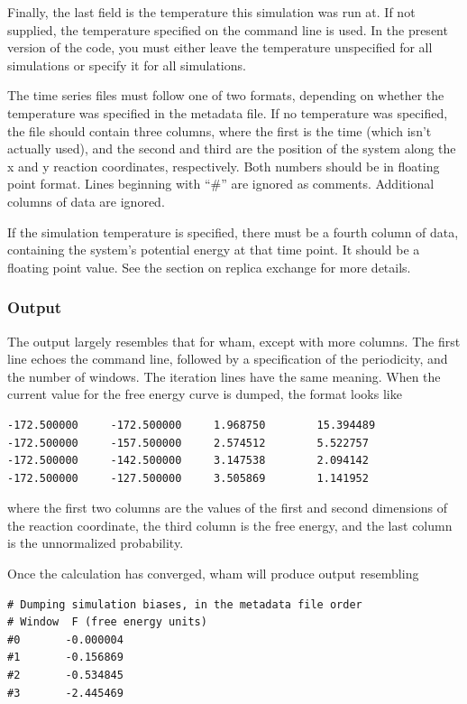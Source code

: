 \documentclass[12pt]{article}
\begin{document}
Finally, the last field is the temperature this simulation was run at.  If
not supplied, the temperature specified on the command line is used.  In
the present version of the code, you must either leave the temperature
unspecified for all simulations or specify it for all simulations.

The time series files must follow one of two formats, depending on whether
the temperature was specified in the metadata file.  If no temperature was
specified, the file should contain three columns, where the first is the
time (which isn't actually used), and the second and third are the position
of the system along the x and y reaction coordinates, respectively.  Both
numbers should be in floating point format.  Lines beginning with ``\#'' are
ignored as comments.  Additional columns of data are ignored.

If the simulation temperature is specified, there must be a fourth column of
data, containing the system's potential energy at that time point.  It
should be a floating point value.  See the section on replica exchange for
more details.

\subsubsection{Output}

The output largely resembles that for wham, except with more columns.  The first
line echoes the command line, followed by a specification of the periodicity,
and the number of windows.  The iteration lines have the same meaning.  When the
current value for the free energy curve is dumped, the format looks like

\begin{verbatim}
-172.500000     -172.500000     1.968750        15.394489
-172.500000     -157.500000     2.574512        5.522757
-172.500000     -142.500000     3.147538        2.094142
-172.500000     -127.500000     3.505869        1.141952
\end{verbatim}
where the first two columns are the values of the first and second
dimensions of the reaction coordinate, the third column is the free energy, and
the last column is the unnormalized probability.

Once the calculation has converged, wham will produce output resembling

\begin{verbatim}
# Dumping simulation biases, in the metadata file order
# Window  F (free energy units)
#0       -0.000004
#1       -0.156869
#2       -0.534845
#3       -2.445469
\end{verbatim}
\end{document}
